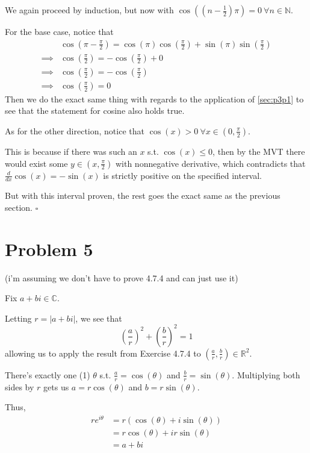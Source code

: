 \documentclass[12pt]{article}
\newcommand{\N}{\mathbb{N}}
\newcommand{\R}{\mathbb{R}}
\newcommand{\C}{\mathbb{C}}
\begin{document}
We again proceed by induction, but now with
$\cos\left(\left(n-\frac{1}{2}\right)\pi\right)=0\ \forall n \in \N$.

For the base case, notice that
\begin{align*}
             & \cos\left(\pi-\frac{\pi}{2}\right)
  = \cos(\pi)\cos\left(\frac{\pi}{2}\right) + \sin(\pi)\sin\left(\frac{\pi}{2}\right) \\
  \implies{} & \cos\left(\frac{\pi}{2}\right) = -\cos\left(\frac{\pi}{2}\right) + 0   \\
  \implies{} & \cos\left(\frac{\pi}{2}\right) = -\cos\left(\frac{\pi}{2}\right)       \\
  \implies{} & \cos\left(\frac{\pi}{2}\right) = 0
\end{align*}
Then we do the exact same thing with regards to the application of \ref{sec:p3p1}
to see that the statement for cosine also holds true.

As for the other direction, notice that $\cos(x) > 0\ \forall x \in \left(0, \frac{\pi}{2}\right)$.

This is because if there was such an $x$ s.t. $\cos(x) \le 0$, then
by the MVT there would exist some $y \in \left(x, \frac{\pi}{2}\right)$
with nonnegative derivative, which contradicts that $\frac{d}{dx} \cos(x)=-\sin(x)$
is strictly positive on the specified interval.

But with this interval proven,
the rest goes the exact same as the previous section. $\square$

\pagebreak

\setcounter{section}{4}

\section{Problem 5}

 (i'm assuming we don't have to prove 4.7.4 and can just use it)

Fix $a+bi \in \C$.

Letting $r=|a+bi|$, we see that
\[\left(\frac{a}{r}\right)^2+\left(\frac{b}{r}\right)^2=1\]
allowing us to apply the result from Exercise 4.7.4 to $\left(\frac{a}{r}, \frac{b}{r}\right) \in \R^2$.

There's exactly one (1) $\theta$ s.t. $\frac{a}{r}=\cos(\theta)$ and $\frac{b}{r}=\sin(\theta)$.
Multiplying both sides by $r$ gets us $a=r\cos(\theta)$ and $b=r\sin(\theta)$.

Thus,
\begin{align*}
  re^{i\theta}
   & = r(\cos(\theta)+i\sin(\theta)) \\
   & = r\cos(\theta)+ir\sin(\theta)  \\
   & = a+bi
\end{align*}
\end{document}
